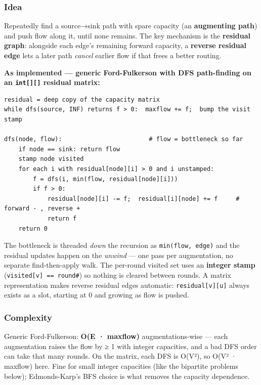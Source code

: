 \documentclass[
  10pt,
  letterpaper,
  onecolumn]{article}
\begin{document}
\hypertarget{idea-24}{%
\subsubsection{Idea}\label{idea-24}}

Repeatedly find a source→sink path with spare capacity (an
\textbf{augmenting path}) and push flow along it, until none remains.
The key mechanism is the \textbf{residual graph}: alongside each edge's
remaining forward capacity, a \textbf{reverse residual edge} lets a
later path \emph{cancel} earlier flow if that frees a better routing.

\textbf{As implemented --- generic Ford-Fulkerson with DFS path-finding
on an \texttt{int{[}{]}{[}{]}} residual matrix:}

\begin{verbatim}
residual = deep copy of the capacity matrix
while dfs(source, INF) returns f > 0:  maxflow += f;  bump the visit stamp

dfs(node, flow):                        # flow = bottleneck so far
    if node == sink: return flow
    stamp node visited
    for each i with residual[node][i] > 0 and i unstamped:
        f = dfs(i, min(flow, residual[node][i]))
        if f > 0:
            residual[node][i] -= f;  residual[i][node] += f     # forward - , reverse +
            return f
    return 0
\end{verbatim}

The bottleneck is threaded \emph{down} the recursion as
\texttt{min(flow,\ edge)} and the residual updates happen on the
\emph{unwind} --- one pass per augmentation, no separate find-then-apply
walk. The per-round visited set uses an \textbf{integer stamp}
(\texttt{visited{[}v{]}\ ==\ round\#}) so nothing is cleared between
rounds. A matrix representation makes reverse residual edges automatic:
\texttt{residual{[}v{]}{[}u{]}} always exists as a slot, starting at 0
and growing as flow is pushed.

\hypertarget{complexity-24}{%
\subsubsection{Complexity}\label{complexity-24}}

Generic Ford-Fulkerson: \textbf{O(E · maxflow)} augmentations-wise ---
each augmentation raises the flow by ≥ 1 with integer capacities, and a
bad DFS order can take that many rounds. On the matrix, each DFS is
O(V²), so O(V² · maxflow) here. Fine for small integer capacities (like
the bipartite problems below); Edmonds-Karp's BFS choice is what removes
the capacity dependence.
\end{document}
